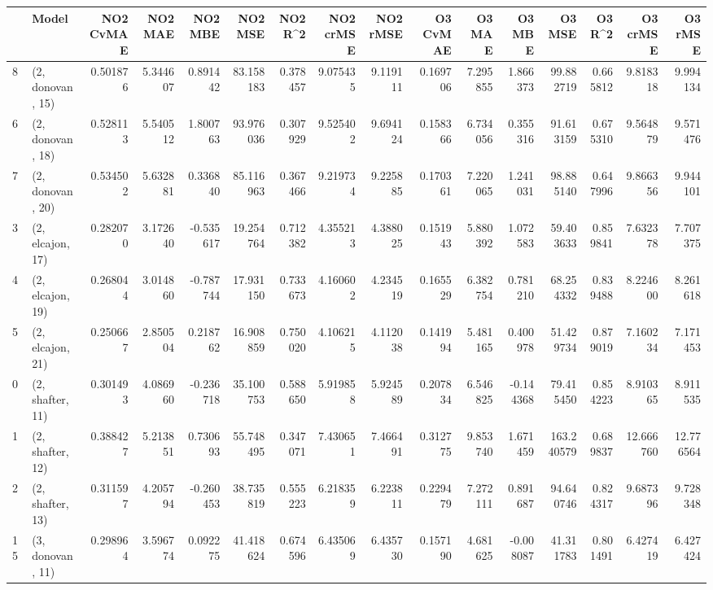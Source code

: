 \begin{tabular}{llrrrrrrrrrrrrrr}
\toprule
{} &             Model &  NO2 CvMAE &   NO2 MAE &   NO2 MBE &    NO2 MSE &   NO2 R\textasciicircum2 &  NO2 crMSE &  NO2 rMSE &  O3 CvMAE &    O3 MAE &    O3 MBE &      O3 MSE &    O3 R\textasciicircum2 &   O3 crMSE &    O3 rMSE \\
\midrule
8  &  (2, donovan, 15) &   0.501876 &  5.344607 &  0.891442 &  83.158183 &  0.378457 &   9.075435 &  9.119111 &  0.169706 &  7.295855 &  1.866373 &   99.882719 &  0.665812 &   9.818318 &   9.994134 \\
6  &  (2, donovan, 18) &   0.528113 &  5.540512 &  1.800763 &  93.976036 &  0.307929 &   9.525402 &  9.694124 &  0.158366 &  6.734056 &  0.355316 &   91.613159 &  0.675310 &   9.564879 &   9.571476 \\
7  &  (2, donovan, 20) &   0.534502 &  5.632881 &  0.336840 &  85.116963 &  0.367466 &   9.219734 &  9.225885 &  0.170361 &  7.220065 &  1.241031 &   98.885140 &  0.647996 &   9.866356 &   9.944101 \\
3  &  (2, elcajon, 17) &   0.282070 &  3.172640 & -0.535617 &  19.254764 &  0.712382 &   4.355213 &  4.388025 &  0.151943 &  5.880392 &  1.072583 &   59.403633 &  0.859841 &   7.632378 &   7.707375 \\
4  &  (2, elcajon, 19) &   0.268044 &  3.014860 & -0.787744 &  17.931150 &  0.733673 &   4.160602 &  4.234519 &  0.165529 &  6.382754 &  0.781210 &   68.254332 &  0.839488 &   8.224600 &   8.261618 \\
5  &  (2, elcajon, 21) &   0.250667 &  2.850504 &  0.218762 &  16.908859 &  0.750020 &   4.106215 &  4.112038 &  0.141994 &  5.481165 &  0.400978 &   51.429734 &  0.879019 &   7.160234 &   7.171453 \\
0  &  (2, shafter, 11) &   0.301493 &  4.086960 & -0.236718 &  35.100753 &  0.588650 &   5.919858 &  5.924589 &  0.207834 &  6.546825 & -0.144368 &   79.415450 &  0.854223 &   8.910365 &   8.911535 \\
1  &  (2, shafter, 12) &   0.388427 &  5.213851 &  0.730693 &  55.748495 &  0.347071 &   7.430651 &  7.466491 &  0.312775 &  9.853740 &  1.671459 &  163.240579 &  0.689837 &  12.666760 &  12.776564 \\
2  &  (2, shafter, 13) &   0.311597 &  4.205794 & -0.260453 &  38.735819 &  0.555223 &   6.218359 &  6.223811 &  0.229479 &  7.272111 &  0.891687 &   94.640746 &  0.824317 &   9.687396 &   9.728348 \\
15 &  (3, donovan, 11) &   0.298964 &  3.596774 &  0.092275 &  41.418624 &  0.674596 &   6.435069 &  6.435730 &  0.157190 &  4.681625 & -0.008087 &   41.311783 &  0.801491 &   6.427419 &   6.427424 \\

\end{tabular}
